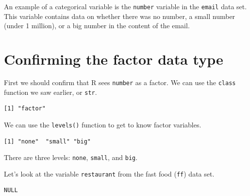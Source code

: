 \documentclass[
  letterpaper,
  DIV=11,
  numbers=noendperiod,
  oneside]{scrreprt}
\newenvironment{Shaded}{\begin{snugshade}}{\end{snugshade}}
\newcommand{\FunctionTok}[1]{\textcolor[rgb]{0.28,0.35,0.67}{#1}}
\newcommand{\NormalTok}[1]{\textcolor[rgb]{0.00,0.23,0.31}{#1}}
\newcommand{\SpecialCharTok}[1]{\textcolor[rgb]{0.37,0.37,0.37}{#1}}
\begin{document}
An example of a categorical variable is the \texttt{number} variable in
the \texttt{email} data set. This variable contains data on whether
there was no number, a small number (under 1 million), or a big number
in the content of the email.

\section{Confirming the factor data
type}\label{confirming-the-factor-data-type}

First we should confirm that R sees \texttt{number} as a factor. We can
use the \texttt{class} function we saw earlier, or \texttt{str}.

\begin{Shaded}
\end{Shaded}

\begin{verbatim}
[1] "factor"
\end{verbatim}

We can use the \texttt{levels()} function to get to know factor
variables.

\begin{Shaded}
\end{Shaded}

\begin{verbatim}
[1] "none"  "small" "big"  
\end{verbatim}

There are three levels: \texttt{none}, \texttt{small}, and \texttt{big}.

\begin{tcolorbox}[enhanced jigsaw, bottomrule=.15mm, colback=white, colframe=quarto-callout-tip-color-frame, toprule=.15mm, coltitle=black, rightrule=.15mm, opacitybacktitle=0.6, colbacktitle=quarto-callout-tip-color!10!white, toptitle=1mm, leftrule=.75mm, breakable, bottomtitle=1mm, titlerule=0mm, title=\textcolor{quarto-callout-tip-color}{\faLightbulb}\hspace{0.5em}{Character data types}, arc=.35mm, left=2mm, opacityback=0]

Let's look at the variable \texttt{restaurant} from the fast food
(\texttt{ff}) data set.

\begin{Shaded}
\end{Shaded}

\begin{verbatim}
NULL
\end{verbatim}

\end{tcolorbox}
\end{document}
